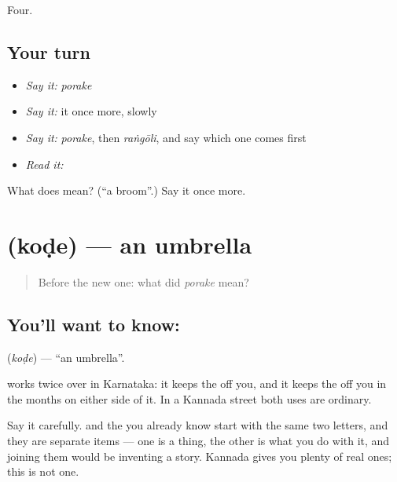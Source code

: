\begin{grammarlens}[title={What you've built}]
Four.
\end{grammarlens}

\subsection*{Your turn}
\begin{itemize}
\raggedright
  \item \emph{Say it:} \emph{porake}
  \item \emph{Say it:} it once more, slowly
  \item \emph{Say it:} \emph{porake}, then \emph{raṅgōli}, and say which one comes first
  \item \emph{Read it:} \textbf{}
\end{itemize}

\begin{tcolorbox}[breakable,colback=teal!4,colframe=teal!35!black,title={Before you move on}]
What does  mean? (\textquotedblleft{}a broom\textquotedblright{}.) Say it once more.
\end{tcolorbox}
\section[\texorpdfstring{\kn{ಕೊಡೆ} (koḍe)}{ಕೊಡೆ (koḍe)}]{ (koḍe) — an umbrella}

\label{lesson:KA-C62-umbrella}



\begin{quote}
Before the new one: what did \emph{porake} mean?
\end{quote}

\subsection*{You'll want to know: }
\textbf{} (\emph{koḍe}) — \textquotedblleft{}an umbrella\textquotedblright{}.

 works twice over in Karnataka: it keeps the  off you, and it keeps the  off you in the months on either side of it. In a Kannada street both uses are ordinary.

Say it carefully.  and the  you already know start with the same two letters, and they are separate items — one is a thing, the other is what you do with it, and joining them would be inventing a story. Kannada gives you plenty of real ones; this is not one.

